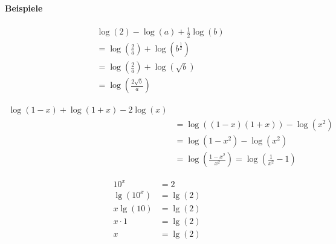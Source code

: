 \paragraph{Beispiele}

\begin{align*}
	 & \log(2) - \log(a) + \frac{1}{2} \log(b)                           \\
	 & = \log\left(\frac{2}{a}\right) + \log\left(b^{\frac{1}{2}}\right) \\
	 & = \log\left(\frac{2}{a}\right) + \log\left(\sqrt{b}\right)        \\
	 & = \log\left(\frac{2 \sqrt{b}}{a}\right)
\end{align*}

\begin{align*}
	\log(1-x) + \log(1+x) - 2 \log(x)                                          \\
	 & = \log((1-x)(1+x)) - \log\left(x^2\right)                               \\
	 & = \log(1-x^2) - \log\left(x^2\right)                                    \\
	 & = \log\left(\frac{1-x^2}{x^2}\right) = \log\left(\frac{1}{x^2}-1\right)
\end{align*}

\begin{align*}
	10^x                 & = 2      \\
	\lg\left(10^x\right) & = \lg(2) \\
	x \lg(10)            & = \lg(2) \\
	x \cdot 1            & = \lg(2) \\
	x                    & = \lg(2)
\end{align*}

